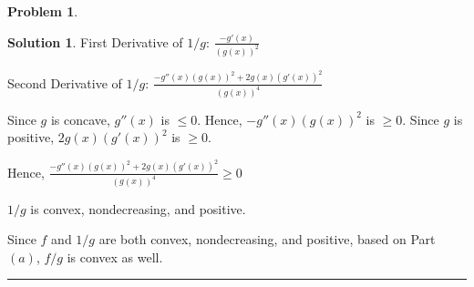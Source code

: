 \documentclass{article}
\theoremstyle{definition}
\newtheorem{problem}{Problem}
\def\fline{\rule{0.75\linewidth}{0.5pt}}
\newcommand{\finishline}{\begin{center}\fline\end{center}}
\newtheorem*{solution*}{Solution}
\newenvironment{solution}{\begin{solution*}}{{\finishline} \end{solution*}}
\begin{document}
\begin{problem}
\begin{itemize}
\begin{solution}
            First Derivative of $1/g$: $\frac{-g'(x)}{(g(x))^2}$ \newline 

            Second Derivative of $1/g$: $\frac{-g''(x)(g(x))^2 + 2g(x) (g'(x))^2}{(g(x))^4}$ \newline 

            Since $g$ is concave, $g''(x)$ is $\leq 0$. Hence, $-g''(x)(g(x))^2$ is $\geq 0$. Since $g$ is positive, $2g(x) (g'(x))^2$ is $\geq 0$. 

            Hence, $\frac{-g''(x)(g(x))^2 + 2g(x) (g'(x))^2}{(g(x))^4} \geq 0$

            $1/g$ is convex, nondecreasing, and positive. \newline 

            Since $f$ and $1/g$ are both convex, nondecreasing, and positive, based on Part $(a)$, $f/g$ is convex as well. 

        \end{solution}
    \end{itemize}
\end{problem}
\end{document}
